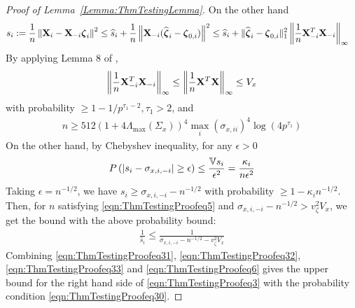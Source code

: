 \documentclass[12pt, letterpaper]{article}
\numberwithin{equation}{section}
\begin{document}
\begin{proof}[Proof of Lemma~\ref{Lemma:ThmTestingLemma}]
On the other hand
%
\begin{align*}
s_i := \frac{1}{n} \left\| {\mathbf{X}}_i - {\mathbf{X}}_{-i}  {\boldsymbol{\zeta}}_i \right\|^2 & \leq 
\widehat s_i + \frac{1}{n} \left\| {\mathbf{X}}_{-i} (\widehat {{\boldsymbol{\zeta}}}_i - {\boldsymbol{\zeta}}_{0,i} ) \right\|^2
\leq \widehat s_i + \| \widehat {{\boldsymbol{\zeta}}}_i - {\boldsymbol{\zeta}}_{0,i} \|_1^2 \left\| \frac{1}{n} {\mathbf{X}}_{-i}^T {\mathbf{X}}_{-i} \right\|_\infty
\end{align*}
%
By applying Lemma 8 of \cite{RavikumarEtal11},
%
\begin{align}\label{eqn:ThmTestingProofeq34}
\left\| \frac{1}{n} {\mathbf{X}}_{-i}^T {\mathbf{X}}_{-i} \right\|_\infty \leq
\left\| \frac{1}{n} {\mathbf{X}}^T {\mathbf{X}} \right\|_\infty \leq V_x
\end{align}
%
with probability $ \geq 1 - 1/p^{\tau_1-2}, \tau_1>2$, and
%
\begin{align}\label{eqn:ThmTestingProofeq5}
n \geq 512 ( 1 + 4 \Lambda_{\max} (\Sigma_{x}))^4 \max_i (\sigma_{x,ii} )^4 \log (4p^{\tau_1})
\end{align}
%
On the other hand, by Chebyshev inequality, for any $\epsilon>0$
%
$$
P\left( | s_i - \sigma_{x,i,-i}| \geq \epsilon \right) \leq \frac{{\mathbb{V}} s_i}{\epsilon^2} =
\frac{\kappa_i}{n \epsilon^2}
$$
%
Taking $\epsilon = n^{-1/2}$, we have $s_i \geq \sigma_{x,i,-i} - n^{-1/2}$ with probability $\geq 1 - \kappa_i n^{-1/2}$. Then, for $n$ satisfying \eqref{eqn:ThmTestingProofeq5} and $\sigma_{x,i,-i} - n^{-1/2} > v_\zeta^2 V_x$, we get the bound with the above probability bound:
%
\begin{align}\label{eqn:ThmTestingProofeq6}
\frac{1}{\widehat s_i} \leq \frac{1}{\sigma_{x,i,-i} - n^{-1/2} - v_\zeta^2 V_x}
\end{align}
%
Combining \eqref{eqn:ThmTestingProofeq31}, \eqref{eqn:ThmTestingProofeq32}, \eqref{eqn:ThmTestingProofeq33} and \eqref{eqn:ThmTestingProofeq6} gives the upper bound for the right hand side of \eqref{eqn:ThmTestingProofeq3} with the probability condition \eqref{eqn:ThmTestingProofeq30}.


\end{proof}
\end{document}
